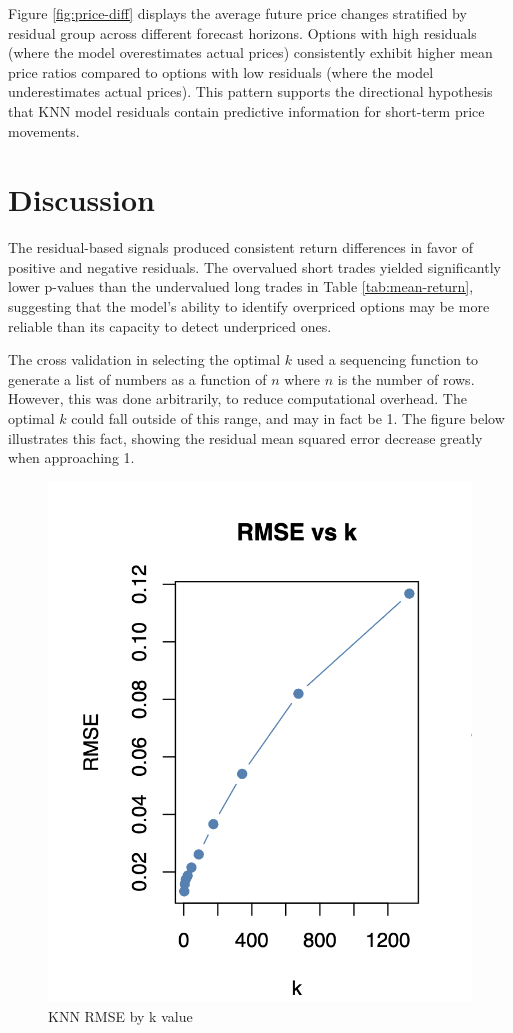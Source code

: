 \documentclass{article}
\begin{document}
Figure \ref{fig:price-diff} displays the average future price changes stratified by residual group across different forecast horizons. Options with high residuals (where the model overestimates actual prices) consistently exhibit higher mean price ratios compared to options with low residuals (where the model underestimates actual prices). This pattern supports the directional hypothesis that KNN model residuals contain predictive information for short-term price movements.

\section{Discussion}
The residual-based signals produced consistent return differences in favor of positive and negative residuals. The overvalued short trades yielded significantly lower p-values than the undervalued long trades in Table \ref{tab:mean-return}, suggesting that the model's ability to identify overpriced options may be more reliable than its capacity to detect underpriced ones.

The cross validation in selecting the optimal $k$ used a sequencing function to generate a list of numbers as a function of $n$ where $n$ is the number of rows. However, this was done arbitrarily, to reduce computational overhead. The optimal $k$ could fall outside of this range, and may in fact be 1. The figure below illustrates this fact, showing the residual mean squared error decrease greatly when approaching 1.

\begin{figure}[h]
  \centering
  \includegraphics[width=0.8\linewidth]{data/results/knn_rmse.png}
  \caption{KNN RMSE by k value}
  \label{fig:knn-rmse}
\end{figure}
\end{document}
